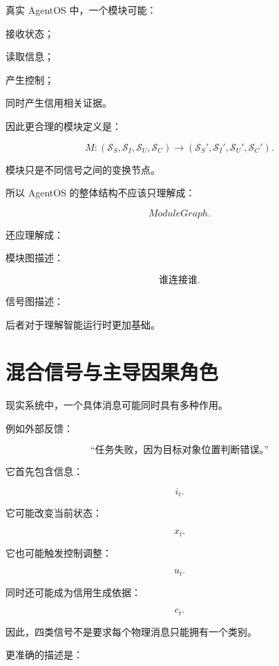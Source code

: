 真实 AgentOS 中，一个模块可能：

接收状态；

读取信息；

产生控制；

同时产生信用相关证据。

因此更合理的模块定义是：

\[
\boxed{
M:
(\mathcal S_S,
\mathcal S_I,
\mathcal S_U,
\mathcal S_C)
\rightarrow
(\mathcal S_S',
\mathcal S_I',
\mathcal S_U',
\mathcal S_C').
}
\]

模块只是不同信号之间的变换节点。

所以 AgentOS 的整体结构不应该只理解成：

\[
ModuleGraph.
\]

还应理解成：

\begin{statementbox}
\centering
{}
\end{statementbox}

模块图描述：

\[
\text{谁连接谁}.
\]

信号图描述：

\begin{statementbox}
\centering
{}
\end{statementbox}

后者对于理解智能运行时更加基础。

\section{混合信号与主导因果角色}

现实系统中，一个具体消息可能同时具有多种作用。

例如外部反馈：

\[
\text{“任务失败，因为目标对象位置判断错误。”}
\]

它首先包含信息：

\[
i_t.
\]

它可能改变当前状态：

\[
x_t.
\]

它也可能触发控制调整：

\[
u_t.
\]

同时还可能成为信用生成依据：

\[
c_t.
\]

因此，四类信号不是要求每个物理消息只能拥有一个类别。

更准确的描述是：

